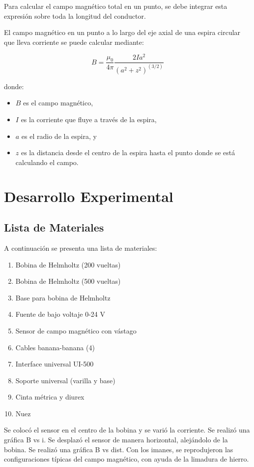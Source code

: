 \documentclass{article}
\begin{document}
\begin{multicols}{2}
Para calcular el campo magnético total en un punto, se debe integrar esta expresión sobre toda la longitud del conductor.

El campo magnético en un punto a lo largo del eje axial de una espira circular que lleva corriente se puede calcular mediante:

\begin{equation}
B = \frac{\mu_0}{4\pi} \frac{2Ia^2}{(a^2 + z^2)^{(3/2)}}
\end{equation}

donde:
\begin{itemize}
\item $B$ es el campo magnético,
\item $I$ es la corriente que fluye a través de la espira,
\item $a$ es el radio de la espira, y
\item $z$ es la distancia desde el centro de la espira hasta el punto donde se está calculando el campo.
\end{itemize}


\section{Desarrollo Experimental}\label{Desarrollo experimental}				%
\subsection*{Lista de Materiales}
A continuación se presenta una lista de materiales:
\begin{enumerate}
    \item Bobina de Helmholtz (200 vueltas)
    \item Bobina de Helmholtz (500 vueltas)
    \item Base para bobina de Helmholtz
    \item Fuente de bajo voltaje 0-24 V
    \item Sensor de campo magnético con vástago 
    \item Cables banana-banana (4)
    \item Interface universal UI-500
    \item Soporte universal (varilla y base)
    \item Cinta métrica y diurex
    \item Nuez
\end{enumerate}
Se colocó el sensor en el centro de la bobina y se varió la corriente. Se realizó una gráfica B vs i. Se desplazó el sensor de manera horizontal, alejándolo de la bobina. Se realizó una gráfica B vs dist. Con los imanes, se reprodujeron las configuraciones típicas del campo magnético, con ayuda de la limadura de hierro.
\end{multicols}
\end{document}
